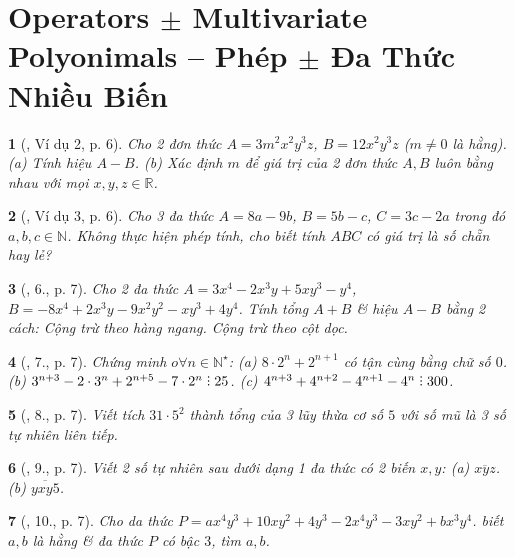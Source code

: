 \documentclass{article}
\newtheorem{baitoan}{}
\DeclareRobustCommand{\divby}{%
	\mathrel{\vbox{\baselineskip.65ex\lineskiplimit0pt\hbox{.}\hbox{.}\hbox{.}}}%
}
\begin{document}

\section{Operators $\pm$ Multivariate Polyonimals -- Phép $\pm$ Đa Thức Nhiều Biến}

\begin{baitoan}[\cite{Tuyen_Toan_8}, Ví dụ 2, p. 6]
	Cho 2 đơn thức $A = 3m^2x^2y^3z$, $B = 12x^2y^3z$ ($m\ne0$ là hằng). (a) Tính hiệu $A - B$. (b) Xác định $m$ để giá trị của 2 đơn thức $A,B$ luôn bằng nhau với mọi $x,y,z\in\mathbb{R}$.
\end{baitoan}

\begin{baitoan}[\cite{Tuyen_Toan_8}, Ví dụ 3, p. 6]
	Cho 3 đa thức $A = 8a - 9b$, $B = 5b - c$, $C = 3c - 2a$ trong đó $a,b,c\in\mathbb{N}$. Không thực hiện phép tính, cho biết tính $ABC$ có giá trị là số chẵn hay lẻ?
\end{baitoan}

\begin{baitoan}[\cite{Tuyen_Toan_8}, 6., p. 7]
	Cho 2 đa thức $A = 3x^4 - 2x^3y + 5xy^3 - y^4$, $B = -8x^4 + 2x^3y - 9x^2y^2 - xy^3 + 4y^4$. Tính tổng $A + B$ \& hiệu $A - B$ bằng 2 cách: Cộng trừ theo hàng ngang. Cộng trừ theo cột dọc.
\end{baitoan}

\begin{baitoan}[\cite{Tuyen_Toan_8}, 7., p. 7]
	Chứng minh $o\forall n\in\mathbb{N}^\star$: (a) $8\cdot2^n + 2^{n+1}$ có tận cùng bằng chữ số $0$. (b) $3^{n+3} - 2\cdot3^n + 2^{n+5} - 7\cdot2^n\divby25$. (c) $4^{n+3} + 4^{n+2} - 4^{n+1} - 4^n\divby300$. 
\end{baitoan}

\begin{baitoan}[\cite{Tuyen_Toan_8}, 8., p. 7]
	Viết tích $31\cdot5^2$ thành tổng của 3 lũy thừa cơ số $5$ với số mũ là 3 số tự nhiên liên tiếp.
\end{baitoan}

\begin{baitoan}[\cite{Tuyen_Toan_8}, 9., p. 7]
	Viết 2 số tự nhiên sau dưới dạng 1 đa thức có 2 biến $x,y$: (a) $\overline{xyz}$. (b) $\overline{yxy5}$.
\end{baitoan}

\begin{baitoan}[\cite{Tuyen_Toan_8}, 10., p. 7]
	Cho da thức $P = ax^4y^3 + 10xy^2 + 4y^3 - 2x^4y^3 - 3xy^2 + bx^3y^4$. biết $a,b$ là hằng \& đa thức $P$ có bậc $3$, tìm $a,b$.
\end{baitoan}
\end{document}
